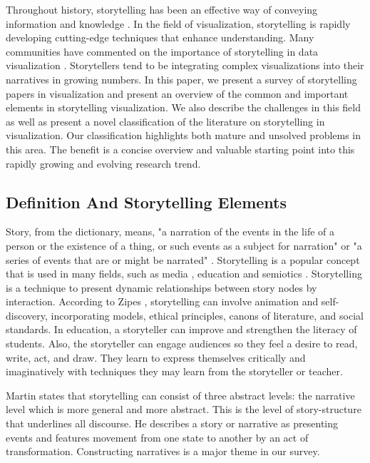 \documentclass{egpubl}
\begin{document}
Throughout history, storytelling has been an effective way of conveying information and knowledge \cite{Lidal2013}. In the field of visualization, storytelling is rapidly developing cutting-edge techniques that enhance understanding. Many communities have commented on the importance of storytelling in data visualization \cite{segal}. Storytellers tend to be integrating complex visualizations into their narratives in growing numbers. In this paper, we present a survey of storytelling papers in visualization and present an overview of the common and important elements in storytelling visualization. We also describe the challenges in this field as well as present a novel classification of the literature on storytelling in visualization. Our classification highlights both mature and unsolved problems in this area. The benefit is a concise overview and valuable starting point into this rapidly growing and evolving research trend. 

\subsection{Definition And Storytelling Elements}
Story, from the dictionary, means, "a narration of the events in the life of a person or the existence of a thing, or such events as a subject for narration" \cite{story1} or "a series of events that are or might be narrated" \cite{story2}. Storytelling is a popular concept that is used in many fields, such as media \cite{segal}, education \cite{Jack1995} and semiotics \cite{Martin1997}.
Storytelling is a technique to present dynamic relationships between story nodes by interaction.
According to Zipes \cite{Jack1995}, storytelling can involve animation and self-discovery, incorporating models, ethical principles, canons of literature, and social standards. In education, a storyteller can improve and strengthen the literacy of students. Also, the storyteller can engage audiences so they feel a desire to read, write, act, and draw. They learn to express themselves critically and imaginatively with techniques they may learn from the storyteller or teacher.

Martin\cite{Martin1997} states that storytelling can consist of three abstract levels: the narrative level which is more general and more abstract. This is the level of story-structure that underlines all discourse. He describes a story or narrative as presenting events and features movement from one state to another by an act of transformation. Constructing narratives is a major theme in our survey.
\end{document}
